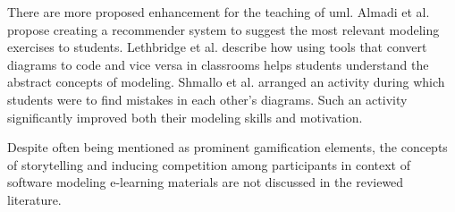 There are more proposed enhancement for the teaching of \ac{uml}. Almadi et al.\cite{almadi2018cdrs} propose creating a recommender system to suggest the most relevant modeling exercises to students. Lethbridge et al.\cite{umple} describe how using tools that convert diagrams to code and vice versa in classrooms helps students understand the abstract concepts of modeling. Shmallo et al.\cite{shmallo2020constructive} arranged an activity during which students were to find mistakes in each other's diagrams. Such an activity significantly improved both their modeling skills and motivation. 

Despite often being mentioned as prominent gamification elements, the concepts of storytelling and inducing competition among participants in context of software modeling e-learning materials are not discussed in the reviewed literature. 



